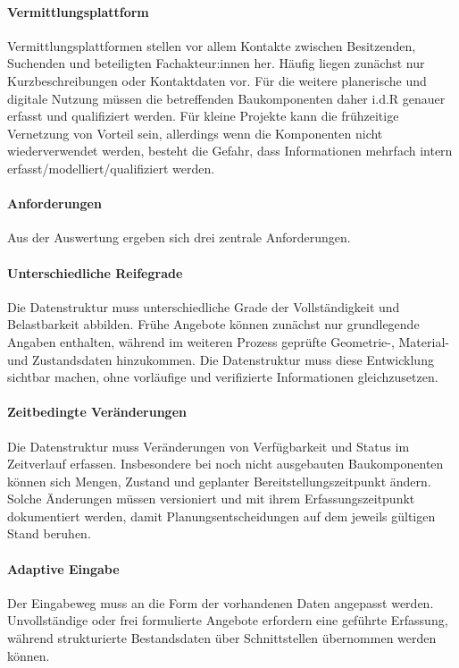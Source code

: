 \documentclass[type=zwischenbericht]{zukunftbau}
\begin{document}
\begin{SemioNest}
\begin{SemioNest}
\paragraph{Vermittlungsplattform}
Vermittlungsplattformen stellen vor allem Kontakte zwischen Besitzenden, Suchenden und beteiligten Fachakteur:innen her. Häufig liegen zunächst nur Kurzbeschreibungen oder Kontaktdaten vor. Für die weitere planerische und digitale Nutzung müssen die betreffenden Baukomponenten daher i.d.R genauer erfasst und qualifiziert werden. Für kleine Projekte kann die frühzeitige Vernetzung von Vorteil sein, allerdings wenn die Komponenten nicht wiederverwendet werden, besteht die Gefahr, dass Informationen mehrfach intern erfasst/modelliert/qualifiziert werden.

\paragraph{Anforderungen}
Aus der Auswertung ergeben sich drei zentrale Anforderungen.

\begin{SemioNest}
\paragraph{Unterschiedliche Reifegrade}
Die Datenstruktur muss unterschiedliche Grade der Vollständigkeit und Belastbarkeit abbilden. Frühe Angebote können zunächst nur grundlegende Angaben enthalten, während im weiteren Prozess geprüfte Geometrie-, Material- und Zustandsdaten hinzukommen. Die Datenstruktur muss diese Entwicklung sichtbar machen, ohne vorläufige und verifizierte Informationen gleichzusetzen.

\paragraph{Zeitbedingte Veränderungen}
Die Datenstruktur muss Veränderungen von Verfügbarkeit und Status im Zeitverlauf erfassen. Insbesondere bei noch nicht ausgebauten Baukomponenten können sich Mengen, Zustand und geplanter Bereitstellungszeitpunkt ändern. Solche Änderungen müssen versioniert und mit ihrem Erfassungszeitpunkt dokumentiert werden, damit Planungsentscheidungen auf dem jeweils gültigen Stand beruhen.

\paragraph{Adaptive Eingabe}
Der Eingabeweg muss an die Form der vorhandenen Daten angepasst werden. Unvollständige oder frei formulierte Angebote erfordern eine geführte Erfassung, während strukturierte Bestandsdaten über Schnittstellen übernommen werden können.
\end{SemioNest}


\end{SemioNest}
\end{SemioNest}
\end{document}
